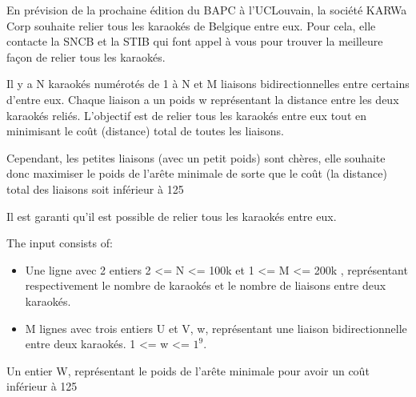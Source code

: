 \problemname{\problemyamlname}


En prévision de la prochaine édition du BAPC à l'UCLouvain, la société KARWa Corp souhaite relier tous les karaokés de Belgique entre eux. Pour cela, elle contacte la SNCB et la STIB qui font appel à vous pour trouver la meilleure façon de relier tous les karaokés.

Il y a N karaokés numérotés de 1 à N et M liaisons bidirectionnelles entre certains d'entre eux. Chaque liaison a un poids w représentant la distance entre les deux karaokés reliés. L'objectif est de relier tous les karaokés entre eux tout en minimisant le coût (distance) total de toutes les liaisons.

Cependant, les petites liaisons (avec un petit poids) sont chères, elle souhaite donc maximiser le poids de l'arête minimale de sorte que le coût (la distance) total des liaisons soit inférieur à 125%

Il est garanti qu'il est possible de relier tous les karaokés entre eux.


\begin{Input}
    The input consists of:
    \begin{itemize}
        \item Une ligne avec 2 entiers 2 <= N <= 100k et 1 <= M <= 200k , représentant respectivement le nombre de karaokés et le nombre de liaisons entre deux karaokés.
        \item M lignes avec trois entiers U et V, w, représentant une liaison bidirectionnelle entre deux karaokés. 1 <= w <= $1^9$.
    \end{itemize}
\end{Input}

\begin{Output}
    Un entier W, représentant le poids de l'arête minimale pour avoir un coût inférieur à 125%
\end{Output}
